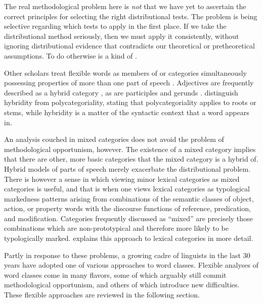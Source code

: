 The real methodological problem here is \emph{not} that we have yet to ascertain the correct principles for selecting the right distributional tests. The problem is being selective regarding which tests to apply in the first place. If we take the distributional method seriously, then we must apply it consistently, without ignoring distributional evidence that contradicts our theoretical or pretheoretical assumptions. To do otherwise is a kind of  \parencite[30, 41]{Croft2001b}.

Other scholars treat flexible words as members of  or  categories simultaneously possessing properties of more than one part of speech \parencites[149]{Loisetal2017}{Malouf1999}{NikolaevaSpencer2020}. Adjectives are frequently described as a hybrid category \parencites{Wetzer1996}[343]{Stassen1997}[13--16]{Pustet2003}[95]{GenettiHildebrandt2004}{Lier2017}, as are participles \parencite[704]{HopperThompson1984} and gerunds \parencite{Denison2001}. \textcite[149]{Loisetal2017} distinguish hybridity from polycategoriality, stating that polycategoriality applies to roots or stems, while hybridity is a matter of the syntactic context that a word appears in.

An analysis couched in mixed categories does not avoid the problem of methodological opportunism, however. The existence of a mixed category implies that there are other, more basic categories that the mixed category is a hybrid of. Hybrid models of parts of speech merely exacerbate the distributional problem. There is however a sense in which viewing minor lexical categories as mixed categories is useful, and that is when one views lexical categories as typological markedness patterns arising from combinations of the semantic classes of object, action, or property words with the discourse functions of reference, predication, and modification. Categories frequently discussed as \enquote{mixed} are precisely those combinations which are non-prototypical and therefore more likely to be typologically marked.  explains this approach to lexical categories in more detail.

Partly in response to these problems, a growing cadre of linguists in the last 30 years have adopted one of various  approaches to word classes. Flexible analyses of word classes come in many flavors, some of which arguably still commit methodological opportunism, and others of which introduce new difficulties. These flexible approaches are reviewed in the following section.

